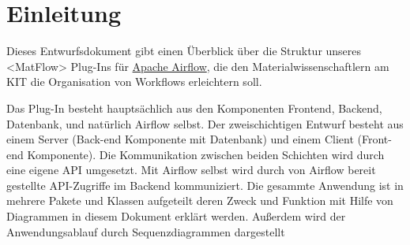 \section{Einleitung}


Dieses Entwurfsdokument gibt einen Überblick über die Struktur unseres <MatFlow> Plug-Ins für \href{https://airflow.apache.org}{Apache Airflow}, die den Materialwissenschaftlern am KIT die Organisation von Workflows erleichtern soll.

Das Plug-In besteht hauptsächlich aus den Komponenten Frontend, Backend, Datenbank, und natürlich Airflow selbst. Der zweischichtigen Entwurf besteht aus einem Server (Back-end Komponente mit Datenbank) und einem Client (Front-end Komponente). Die Kommunikation zwischen beiden Schichten wird durch eine eigene API umgesetzt. Mit Airflow selbst wird durch von Airflow bereit gestellte API-Zugriffe im Backend kommuniziert.
Die gesammte Anwendung ist in mehrere Pakete und Klassen aufgeteilt deren Zweck und  Funktion mit Hilfe von Diagrammen in diesem Dokument erklärt werden. Außerdem wird der Anwendungsablauf durch Sequenzdiagrammen dargestellt


\newpage